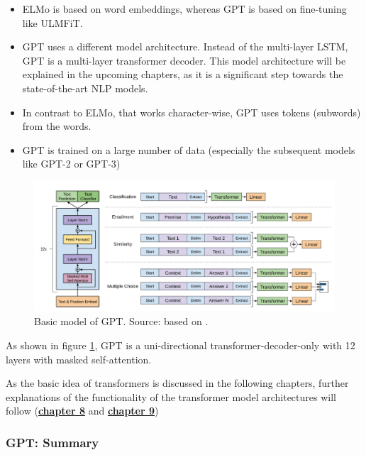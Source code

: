 \documentclass[]{krantz}
\begin{document}
\begin{itemize}
\item
  ELMo is based on word embeddings, whereas GPT is based on fine-tuning like ULMFiT.
\item
  GPT uses a different model architecture. Instead of the multi-layer LSTM, GPT is a multi-layer transformer decoder. This model architecture will be explained in the upcoming chapters, as it is a significant step towards the state-of-the-art NLP models.
\item
  In contrast to ELMo, that works character-wise, GPT uses tokens (subwords) from the words.
\item
  GPT is trained on a large number of data (especially the subsequent models like GPT-2 or GPT-3)
\end{itemize}



\begin{figure}

{\centering \includegraphics[width=0.8\linewidth]{figures/02-01-transfer-learning-for-nlp-1/gpt} 

}

\caption{Basic model of GPT. Source: based on \citet{radford2018}.}\label{fig:ch21-figuregpt}
\end{figure}

As shown in figure \ref{fig:ch21-figuregpt}, GPT is a uni-directional transformer-decoder-only with 12 layers with masked self-attention.

As the basic idea of transformers is discussed in the following chapters, further explanations of the functionality of the transformer model architectures will follow (\protect\hyperlink{attention-and-self-attention-for-nlp}{\textbf{chapter 8}} and \protect\hyperlink{transfer-learning-for-nlp-ii}{\textbf{chapter 9}})

\hypertarget{gpt-summary}{%
\subsubsection{GPT: Summary}\label{gpt-summary}}
\end{document}
